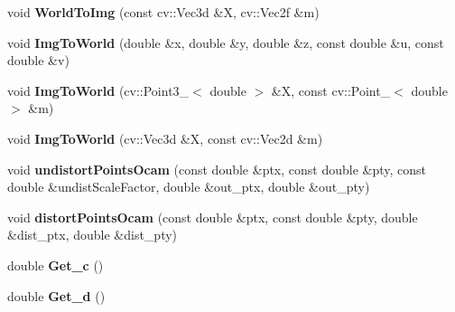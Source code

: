 \begin{DoxyCompactItemize}
\item 
void {\bfseries World\+To\+Img} (const cv\+::\+Vec3d \&X, cv\+::\+Vec2f \&m)\hypertarget{classMultiColSLAM_1_1cCamModelGeneral___a3666d308b6a8eac58d4aed94b3b8f96a}{}\label{classMultiColSLAM_1_1cCamModelGeneral___a3666d308b6a8eac58d4aed94b3b8f96a}

\item 
void {\bfseries Img\+To\+World} (double \&x, double \&y, double \&z, const double \&u, const double \&v)\hypertarget{classMultiColSLAM_1_1cCamModelGeneral___acd01f911ab2dbc9d6efe21e7029bb0f5}{}\label{classMultiColSLAM_1_1cCamModelGeneral___acd01f911ab2dbc9d6efe21e7029bb0f5}

\item 
void {\bfseries Img\+To\+World} (cv\+::\+Point3\+\_\+$<$ double $>$ \&X, const cv\+::\+Point\+\_\+$<$ double $>$ \&m)\hypertarget{classMultiColSLAM_1_1cCamModelGeneral___aa845ee27b52be3b79fa060d5ce1bfc02}{}\label{classMultiColSLAM_1_1cCamModelGeneral___aa845ee27b52be3b79fa060d5ce1bfc02}

\item 
void {\bfseries Img\+To\+World} (cv\+::\+Vec3d \&X, const cv\+::\+Vec2d \&m)\hypertarget{classMultiColSLAM_1_1cCamModelGeneral___abd2ddb40da2b6c676d17353b3297d608}{}\label{classMultiColSLAM_1_1cCamModelGeneral___abd2ddb40da2b6c676d17353b3297d608}

\item 
void {\bfseries undistort\+Points\+Ocam} (const double \&ptx, const double \&pty, const double \&undist\+Scale\+Factor, double \&out\+\_\+ptx, double \&out\+\_\+pty)\hypertarget{classMultiColSLAM_1_1cCamModelGeneral___a6ffc49b9df96a97ef05e2614da1d5cf7}{}\label{classMultiColSLAM_1_1cCamModelGeneral___a6ffc49b9df96a97ef05e2614da1d5cf7}

\item 
void {\bfseries distort\+Points\+Ocam} (const double \&ptx, const double \&pty, double \&dist\+\_\+ptx, double \&dist\+\_\+pty)\hypertarget{classMultiColSLAM_1_1cCamModelGeneral___a1a259eb069f68cd26c211a155c02aef0}{}\label{classMultiColSLAM_1_1cCamModelGeneral___a1a259eb069f68cd26c211a155c02aef0}

\item 
double {\bfseries Get\+\_\+c} ()\hypertarget{classMultiColSLAM_1_1cCamModelGeneral___a655e3c58d273b15831d84ae96a27fcb0}{}\label{classMultiColSLAM_1_1cCamModelGeneral___a655e3c58d273b15831d84ae96a27fcb0}

\item 
double {\bfseries Get\+\_\+d} ()\hypertarget{classMultiColSLAM_1_1cCamModelGeneral___a366478b0d58a574cb3dae435aebfaeef}{}\label{classMultiColSLAM_1_1cCamModelGeneral___a366478b0d58a574cb3dae435aebfaeef}


\end{DoxyCompactItemize}
